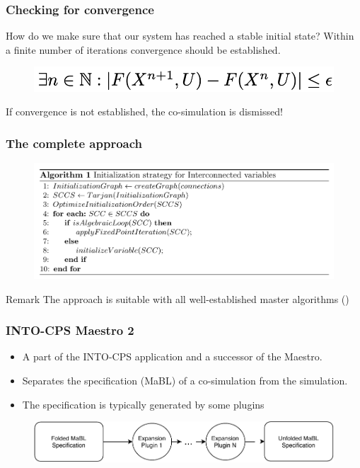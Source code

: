 \documentclass{beamer}
\begin{document}
\begin{frame}
\frametitle{Checking for convergence}
How do we make sure that our system has reached a stable initial state?
Within a finite number of iterations convergence should  be established.
\begin{figure}
    \centering
    \includegraphics[scale=0.3]{images/Screenshot 2020-09-09 at 20.51.28.png}
\end{figure}

If convergence is not established, the co-simulation is dismissed!
\end{frame}



\begin{frame}[fragile]
\frametitle{The complete approach}
\begin{figure}
    \centering
    \includegraphics[scale=0.25]{images/Screenshot 2020-09-09 at 09.12.56.png}
\end{figure}

\begin{block}{Remark} 
    The approach is suitable with all well-established master algorithms ()
\end{block}
\end{frame}


\begin{frame}
\frametitle{INTO-CPS Maestro 2}
\begin{itemize}
    \item A part of the INTO-CPS application and a successor of the Maestro.    
    \item Separates the specification (MaBL) of a co-simulation from the simulation.
    \item The specification is typically generated by some plugins
\end{itemize}
\begin{figure}
    \centering
    \includegraphics[scale=0.6]{images/ExpansionPlugin-Page-1.pdf}
    \label{fig:my_label}
\end{figure}
\end{frame}
\end{document}
